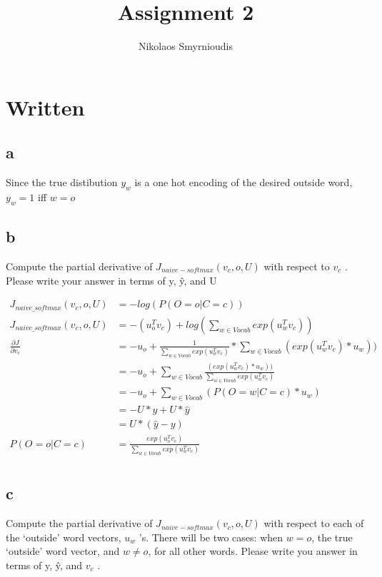 \documentclass{article}
\author{Nikolaos Smyrnioudis}
\title{Assignment 2}
\newcommand{\pd}[2]{\frac{\partial #1}{\partial #2}}
\begin{document}
\maketitle
\section{Written}
\subsection{a}

Since the true distibution $y_w$ is a one hot encoding of the desired outside word, $y_w = 1$ iff $w = o$

\subsection{b}

Compute the partial derivative of $J_{naive-softmax}(v_c , o, U )$ with respect to $v_c$ . Please write your
answer in terms of y, ŷ, and U

\begin{align*}
	J_{naive\_softmax}(v_c , o , U) &= -log (P(O = o | C =c )) \\
	J_{naive\_softmax}(v_c , o , U) &= -(u_o^T v_c) + log(\sum_{w \in Vocab}exp(u_w^T v_c))\\
	\pd{J}{v_c} &=  -u_o + \frac{1}{\sum_{w \in Vocab} exp(u_w^T v_c)} 
		 * \sum_{w \in Vocab} (exp(u_w^T v_c) * u_w)) \\
	&= -u_o + \sum_{w \in Vocab} \frac{(exp(u_w^T v_c) * u_w))}{\sum_{w \in Vocab}exp(u_w^T v_c)} \\
	&= -u_o + \sum_{w \in Vocab} (P(O = w | C =c ) * u_w) \\
	&= - U * y + U * \hat{y} \\
	&= U * (\hat{y} - y ) \\
	P(O = o | C =c ) &= \frac{exp(u_o^T v_c)}{\sum_{w \in Vocab}exp(u_w^T v_c)} \\
\end{align*}
\subsection{c}
Compute the partial derivative of $J_{naive-softmax}(v_c , o, U )$  with respect to each of the ‘outside’
word vectors, $u_w$ ’s. There will be two cases: when $w = o$, the true ‘outside’ word vector, and $w \neq o$, for
all other words. Please write you answer in terms of y, ŷ, and $v_c$ .
\end{document}
